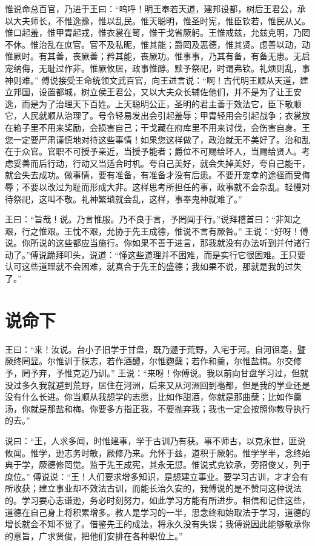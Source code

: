 \documentclass[a4paper,12pt,UTF8,twoside]{ctexbook}
\begin{document}
惟说命总百官，乃进于王曰：“呜呼！明王奉若天道，建邦设都，树后王君公，承以大夫师长，不惟逸豫，惟以乱民。惟天聪明，惟圣时宪，惟臣钦若，惟民从乂。惟口起羞，惟甲胄起戎，惟衣裳在笥，惟干戈省厥躬。王惟戒兹，允兹克明，乃罔不休。惟治乱在庶官。官不及私昵，惟其能；爵罔及恶德，惟其贤。虑善以动，动惟厥时。有其善，丧厥善；矜其能，丧厥功。惟事事，乃其有备，有备无患。无启宠纳侮，无耻过作非。惟厥攸居，政事惟醇。黩予祭祀，时谓弗钦。礼烦则乱，事神则难。”
傅说接受王命统领文武百官，向王进言说：“啊！古代明王顺从天道，建立邦国，设置都城，树立侯王君公，又以大夫众长辅佐他们，并不是为了让王安逸，而是为了治理天下百姓。上天聪明公正，圣明的君主善于效法它，臣下敬顺它，人民就顺从治理了。号令轻易发出会引起羞辱；甲胄轻用会引起战争；衣裳放在箱子里不用来奖励，会损害自己；干戈藏在府库里不用来讨伐，会伤害自身。王您一定要严肃谨慎地对待这些事情！如果您这样做了，政治就无不美好了。治和乱在于众官。官职不可授予亲近，当授予能者；爵位不可赐给坏人，当赐给贤人。考虑妥善而后行动，行动又当适合时机。夸自己美好，就会失掉美好，夸自己能干，就会失去成功。做事情，要有准备，有准备才没有后患。不要开宠幸的途径而受侮辱；不要以改过为耻而形成大非。这样思考所担任的事，政事就不会杂乱。轻慢对待祭祀，这叫不敬。礼神繁琐就会乱，这样，事奉鬼神就难了。”

王曰：“旨哉！说。乃言惟服。乃不良于言，予罔闻于行。”说拜稽首曰：“非知之艰，行之惟艰。王忱不艰，允协于先王成德，惟说不言有厥咎。”
王说：“好呀！傅说。你所说的这些都应当施行。你如果不善于进言，那我就没有办法听到并付诸行动了。”傅说跪拜叩头，说道：“懂这些道理并不困难，而是实行它很困难。王只要认可这些道理就不会困难，就真合于先王的盛德；我如果不说，那就是我的过失了。”

\chapter{说命下}

王曰：“来！汝说。台小子旧学于甘盘，既乃遯于荒野，入宅于河。自河徂亳，暨厥终罔显。尔惟训于朕志，若作酒醴，尔惟麴糵；若作和羹，尔惟盐梅。尔交修予，罔予弃，予惟克迈乃训。”
王说：“来呀！你傅说。我以前向甘盘学习过，但就没过多久我就避到荒野，居住在河洲，后来又从河洲回到亳都，但是我的学业还是没有什么长进。你当顺从我想学的志愿，比如作甜酒，你就是那曲蘖；比如作羹汤，你就是那盐和梅。你要多方指正我，不要抛弃我；我也一定会按照你教导执行的去。”

说曰：“王，人求多闻，时惟建事，学于古训乃有获。事不师古，以克永世，匪说攸闻。惟学，逊志务时敏，厥修乃来。允怀于兹，道积于厥躬。惟学学半，念终始典于学，厥德修罔觉。监于先王成宪，其永无愆。惟说式克钦承，旁招俊乂，列于庶位。”
傅说说：“王！人们要求增多知识，是想建立事业。要学习古训，才才会有所收获；建立事业却不效法古训，而能长治久安的，我傅说的是不赞同这种说法的。学习要心志谦逊，务必时刻努力，如此学习方能有所进步。相信和记住这些，道德在自己身上将积累增多。教人是学习的一半，思念终和始取法于学习，道德的增长就会不知不觉了。借鉴先王的成法，将永久没有失误；我傅说因此能够敬承你的意旨，广求贤俊，把他们安排在各种职位上。”
\end{document}
